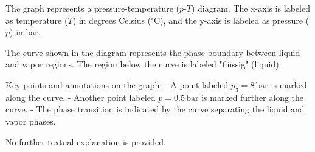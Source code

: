 The graph represents a pressure-temperature (\( p \)-\( T \)) diagram. The x-axis is labeled as temperature (\( T \)) in degrees Celsius (\( ^\circ\text{C} \)), and the y-axis is labeled as pressure (\( p \)) in bar.  

The curve shown in the diagram represents the phase boundary between liquid and vapor regions. The region below the curve is labeled "flüssig" (liquid).  

Key points and annotations on the graph:  
- A point labeled \( p_3 = 8 \, \text{bar} \) is marked along the curve.  
- Another point labeled \( p = 0.5 \, \text{bar} \) is marked further along the curve.  
- The phase transition is indicated by the curve separating the liquid and vapor phases.  

No further textual explanation is provided.